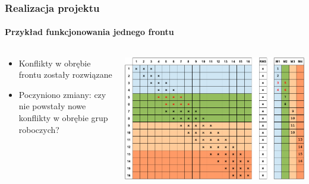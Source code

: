 \documentclass{beamer}
\begin{document}
\begin{frame}
\frametitle{Realizacja projektu}
\framesubtitle{Przykład funkcjonowania jednego frontu}
\begin{columns}[t] %
     \begin{column}[T]{5cm} %
     \begin{itemize}
		\item Konflikty w obrębie frontu zostały rozwiązane
		\item Poczyniono zmiany: czy nie powstały nowe konflikty w obrębie grup roboczych?
     \end{itemize}
     \end{column}
     \begin{column}[T]{7cm} %
		\includegraphics[scale=0.3]{frame2.jpg}
     \end{column}
     \end{columns}
\end{frame}
\end{document}
